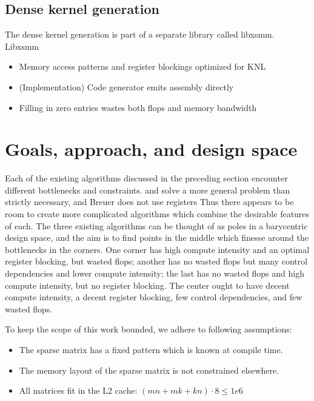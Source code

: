 \subsection{Dense kernel generation}

    The dense kernel generation is part of a separate library called libxsmm.~\cite{Heinecke:2016:LAS:3014904.3015017} Libxsmm 

    \begin{itemize}
      \item Memory access patterns and register blockings optimized for KNL

      \item (Implementation) Code generator emits assembly directly 

      \item Filling in zero entries wastes both flops and memory bandwidth

    \end{itemize}




  \section{Goals, approach, and design space}

  Each of the existing algorithms discussed in the preceding section encounter different bottlenecks and constraints.  and  solve a more general problem than strictly necessary, and Breuer does not use registers Thus there appears to be room to create more complicated algorithms which combine the desirable features of each. The three existing algorithms can be thought of as poles in a barycentric design space, and the aim is to find points in the middle which finesse around the bottlenecks in the corners. One corner has high compute intensity and an optimal register blocking, but wasted flops; another has no wasted flops but many control dependencies and lower compute intensity; the last has no wasted flops and high compute intensity, but no register blocking. The center ought to have decent compute intensity, a decent register blocking, few control dependencies, and few wasted flops. 


  To keep the scope of this work bounded, we adhere to following assumptions:
  \begin{itemize}
    \item The sparse matrix has a fixed pattern which is known at compile time.
    \item The memory layout of the sparse matrix is not constrained elsewhere.
    \item All matrices fit in the L2 cache: $(mn + mk + kn)\cdot 8 \leq 1e6$
  \end{itemize}


